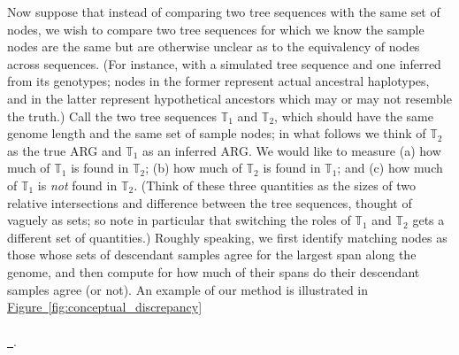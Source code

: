 \documentclass[10pt,twoside,lineno]{gsajnl}
\newcommand{\T}{\mathbb{T}}
\newcommand*{\figref}[2][]{%
	\hyperref[{#2}]{%
		Figure~\ref*{#2}%
		\ifx\\#1\\%
		\else
		\,#1%
		\fi
	}%
}
\begin{document}
Now suppose that instead of comparing two tree sequences with the same set of nodes,
we wish to compare two tree sequences for which we know the sample nodes are the same
but are otherwise unclear as to the equivalency of nodes across sequences.
(For instance, with a simulated tree sequence and one inferred from its genotypes;
nodes in the former represent actual ancestral haplotypes, and in the latter
represent hypothetical ancestors which may or may not resemble the truth.)
Call the two tree sequences $\T_1$ and $\T_2$, which should have the same genome length
and the same set of sample nodes;
in what follows we think of $\T_2$ as the true ARG and $\T_1$ as an inferred ARG. 
We would like to measure (a) how much of $\T_1$ is found in $\T_2$;
(b) how much of $\T_2$ is found in $\T_1$; and
(c) how much of $\T_1$ is \emph{not} found in $\T_2$.
(Think of these three quantities as the sizes of two relative intersections
and difference between the tree sequences,
thought of vaguely as sets;
so note in particular that switching the roles of $\T_1$ and $\T_2$ gets 
a different set of quantities.) 
Roughly speaking, we first identify matching nodes
as those whose sets of descendant samples agree for the largest span along the genome,
and then compute for how much of their spans do their descendant samples agree (or not).
An example of our method is illustrated in \figref{fig:conceptual_discrepancy}.
\end{document}
